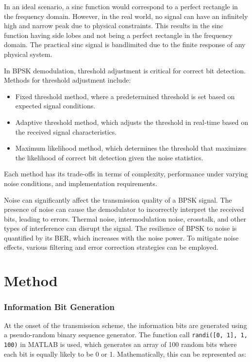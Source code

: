 \documentclass[11pt]{article}
\begin{document}
In an ideal scenario, a sinc function would correspond to a perfect rectangle in the frequency domain. However, in the real world, no signal can have an infinitely high and narrow peak due to physical constraints. This results in the sinc function having side lobes and not being a perfect rectangle in the frequency domain. The practical sinc signal is bandlimited due to the finite response of any physical system.
\newline

In BPSK demodulation, threshold adjustment is critical for correct bit detection. Methods for threshold adjustment include:
\begin{itemize}
    \item Fixed threshold method, where a predetermined threshold is set based on expected signal conditions.
    \item Adaptive threshold method, which adjusts the threshold in real-time based on the received signal characteristics.
    \item Maximum likelihood method, which determines the threshold that maximizes the likelihood of correct bit detection given the noise statistics.
\end{itemize}
Each method has its trade-offs in terms of complexity, performance under varying noise conditions, and implementation requirements.
\newline

Noise can significantly affect the transmission quality of a BPSK signal. The presence of noise can cause the demodulator to incorrectly interpret the received bits, leading to errors. Thermal noise, intermodulation noise, crosstalk, and other types of interference can disrupt the signal. The resilience of BPSK to noise is quantified by its BER, which increases with the noise power. To mitigate noise effects, various filtering and error correction strategies can be employed.


\section*{Method}
\subsubsection*{Information Bit Generation}
At the onset of the transmission scheme, the information bits are generated using a pseudo-random binary sequence generator. The function call \texttt{randi([0, 1], 1, 100)} in MATLAB is used, which generates an array of 100 random bits where each bit is equally likely to be 0 or 1. Mathematically, this can be represented as:
\end{document}
